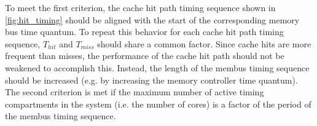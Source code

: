 To meet the first criterion, the cache hit path timing sequence shown in 
\ref{fig:hit_timing} should be aligned with the start of the corresponding 
memory bus time quantum. To repeat this behavior for each cache hit path timing 
sequence, $T_{hit}$ and $T_{miss}$
should share a common factor. Since cache hits are more frequent than misses, 
the performance of the cache hit path should not be weakened to accomplish 
this. Instead, the length of the membus timing sequence should be increased 
(e.g. by increasing the memory controller time quantum). The second criterion 
is met if the maximum number of active timing compartments in the system (i.e.  
the number of cores) is a factor of the period of the membus timing sequence.
